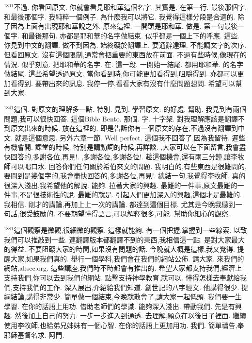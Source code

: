 \documentclass{book}
\begin{document}
$^{1801}$不過.
你看回原文.
你就會看見耶和華這個名字.
其實是.
在第一行.
最後那個字.
和最後那個字.
我純粹一個例子.
為什麼我可以將它.
我覺得這樣分段是合適的.
除了因為上面有出現耶和華說之外.
原來這裡.
一開頭是耶和華.
做是.
第一句最後一個字.
和最後那句.
亦都是耶和華的名字做結束.
似乎都是一個上下的呼應.
這些.
你見到中文的翻譯.
做不到因為.
始終礙於翻譯上.
要通辭達理.
不能調文字的次序.
但看回原文.
沒有這個限制,通常會把重要的東西放在前面.
不過有些時候,像現在的情況.
似乎刻意.
把耶和華的名字.
在.
這一段.
一開始一結尾.
都用耶和華.
的名字做結尾.
這些希望透過原文.
當你看到時,你可能更加看得到,咀嚼得到.
亦都可以更加看得到.
要帶出來的訊息.
我停一停,看看大家有沒有什麼問題想問.
希望可以幫到大家.

$^{1841}$這個.
對原文的理解多一點.
特別.
見到.
學習原文.
的好處.
幫助.
我見到有兩個問題,我可以很快回答.
這個Bible Bento.
那個.
字.
十字架.
對我理解應該是翻譯不到原文出來的時候.
放在這裡的.
即是告訴你有一個原文的存在,不過沒有翻譯到中文.
就是這個意思.
另外六章一節.
Well perfect.
這個我不回答了,因為我留待.
遲些有機會開.
課堂的時候.
特別是講動詞的時候,再詳談.
,大家可以在下面留言,我會盡快回答的,多謝各位,再見!.
,多謝各位,多謝各位!.
趁這個機會,還有兩三分鐘,讓李牧師可以喝口水.
回答你們任何關於希伯來文的問題.
我明白的,有些東西是很難問的,要問到是幾個字的,我會盡快回答的,多謝各位,再見!.
總結一句,我覺得李牧師.
真的很深入淺出,我希望他的解說.
能夠.
拉著大家的興趣.
最難的一件事,原文最難的一件事,不是很技術性的說.
最難的就是.
引起人們更加深入的興趣,這個才是最難的.
我相信.
剛才的講論,再加上上一次的講論.
都達到這個目標.
尤其是今晚我聽到一句話,很受鼓勵的.
不要期望懂得語言,可以解釋很多,可能.
幫助你細心的觀察.

$^{1881}$這個觀察是微觀,很細微的觀察.
這樣就能夠.
有一個把握,掌握到一些線索.
以致我們可以推敲到一些.
連翻譯版本都翻譯不到的東西,我相信這一點.
是對大家最大的得益.
不要阻礙大家的時間,如果沒有問題的話.
今晚就大概是這樣,我又覺得.
提醒大家,如果我們真的.
舉行一個學科,我們會在我們的網站公佈.
請大家.
來我們的網站,abscc.org.
這些講座,我們時不時都會有推出的.
希望大家都支持我們,經濟上支持我們,你可以去到我們的網站.
點擊支持神學教育,就可以.
懂得怎樣去奉獻給我們,支持我們的工作.
深入展出,介紹給我們知道.
創世記的八字經文.
他講得很少.
提綱結論,講得非常少.
簡單做一個結束,今晚就散會了,請大家一起低頭.
我們要一生學習.
在你的話語上用功.
借助老師們的學識.
能夠深入淺出.
帶動我們.
先是有興趣.
然後加上自己的努力.
一步一步進入到通透.
去理解,願意在以後日子裡面.
繼續使用李牧師,也給弟兄姊妹有一個心智.
在你的話語上更加用功.
我們.
簡單禱告,奉耶穌基督名求.
阿門.
\newpage
\end{document}
